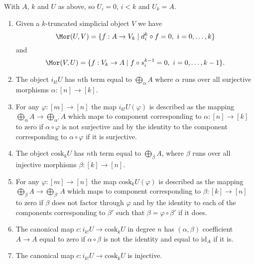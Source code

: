 \begin{lemma}
\label{lemma-eilenberg-maclane-object}
With $A$, $k$ and $U$ as above, so $U_i = 0$, $i < k$ and $U_k = A$.
\begin{enumerate}
\item Given a $k$-truncated simplicial object $V$
we have
$$
\Mor(U, V)
=
\{ f : A \to V_k \mid d^k_i \circ f = 0, \ i = 0, \ldots, k \}
$$
and
$$
\Mor(V, U)
=
\{ f : V_k \to A \mid f \circ s^{k - 1}_i = 0, \ i = 0, \ldots, k - 1 \}.
$$
\item The object $i_{k!} U$ has $n$th term equal to
$\bigoplus_\alpha A$ where $\alpha$ runs over all
surjective morphisms $\alpha : [n] \to [k]$.
\item For any $\varphi : [m] \to [n]$ the map
$i_{k!} U(\varphi)$ is described as the mapping
$\bigoplus_\alpha A \to \bigoplus_{\alpha'} A$
which maps to component corresponding to $\alpha : [n] \to [k]$
to zero if $\alpha \circ \varphi$ is not surjective and
by the identity to the component corresponding to
$\alpha \circ \varphi$ if it is surjective.
\item The object $\text{cosk}_k U$ has $n$th term equal to
$\bigoplus_\beta A$, where $\beta$ runs over all
injective morphisms $\beta : [k] \to [n]$.
\item For any $\varphi : [m] \to [n]$ the map
$\text{cosk}_k U(\varphi)$ is described as the mapping
$\bigoplus_\beta A \to \bigoplus_{\beta'} A$
which maps to component corresponding to $\beta : [k] \to [n]$
to zero if $\beta$ does not factor through $\varphi$ and
by the identity to each of the components corresponding to
$\beta'$ such that $\beta = \varphi \circ \beta'$
if it does.
\item The canonical map
$
c : i_{k !} U \to \text{cosk}_k U
$
in degree $n$ has $(\alpha, \beta)$ coefficient $A \to A$
equal to zero if $\alpha \circ \beta$ is not the identity
and equal to $\text{id}_A$ if it is.
\item The canonical map
$
c : i_{k !} U \to \text{cosk}_k U
$
is injective.
\end{enumerate}
\end{lemma}


